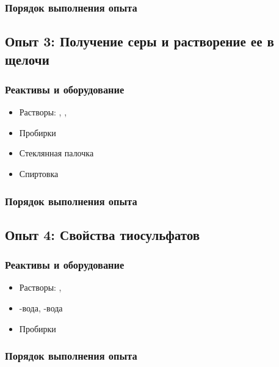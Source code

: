 \documentclass[a4paper, 12pt]{article}
\begin{document}
\subsubsection{Порядок выполнения опыта}

\subsection{Опыт 3: Получение серы и растворение ее в щелочи}

\subsubsection{Реактивы и оборудование}

\begin{itemize}
	\item Растворы: , , 
	
	\item Пробирки
	
	\item Стеклянная палочка
	
	\item Спиртовка
\end{itemize}

\subsubsection{Порядок выполнения опыта}

\subsection{Опыт 4: Свойства тиосульфатов}

\subsubsection{Реактивы и оборудование}

\begin{itemize}
	\item Растворы: , 
	
	\item {}-вода, -вода
	
	\item Пробирки
\end{itemize}

\subsubsection{Порядок выполнения опыта}
\end{document}

